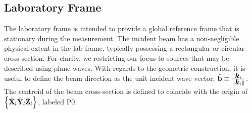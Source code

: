 \documentclass[12pt,letterpaper,final]{amsart}
\newcommand{\mbm}[1]{\ensuremath{\mbox{\boldmath$#1$}}}
\newcommand{\bhat}{\ensuremath{\hat{\mbm{\mathrm{b}}}}}
\newcommand{\Pzero}{\ensuremath{\mathrm{P0}}}
\newcommand{\Xl}{\ensuremath{\hat{\mbm{\mathrm{X}}}_l}}
\newcommand{\Yl}{\ensuremath{\hat{\mbm{\mathrm{Y}}}_l}}
\newcommand{\Zl}{\ensuremath{\hat{\mbm{\mathrm{Z}}}_l}}
\newcommand{\labframe}{\ensuremath{\left\{\Xl\Yl\Zl\right\}}}
\begin{document}
\subsection{Laboratory Frame}\label{S:laboratory}
The laboratory frame is intended to provide a global reference frame
that is stationary during the measurement.  The incident beam has a
non-negligible physical extent in the lab frame, typically possessing
a rectangular or circular cross-section.  For clarity, we restricting
our focus to sources that may be described using plane waves.  With
regards to the geometric construction, it is useful to define the beam
direction as the unit incident wave vector,
$\bhat\equiv\frac{\mbm{k}_i}{\|\mbm{k}_i\|}$.  The centroid of the
beam cross-section is defined to coincide with the origin of
\labframe, labeled \Pzero.
\end{document}
